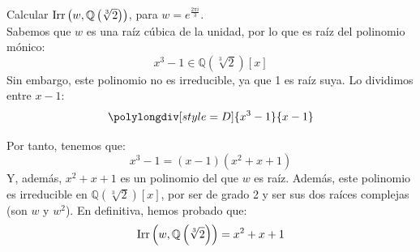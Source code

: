\begin{ejercicio}\label{ej:Irr(w,Q(sqrt[3]{2}))}
    Calcular $\operatorname{Irr}\left(w,\mathbb{Q}\left(\sqrt[3]{2}\right)\right)$, para $w=e^{\frac{2\pi i}{3}}$.\\

    \noindent
    Sabemos que $w$ es una raíz cúbica de la unidad, por lo que es raíz del polinomio mónico:
    \begin{equation*}
        x^3-1\in \mathbb{Q}\left(\sqrt[3]{2}\right)[x]
    \end{equation*}
    Sin embargo, este polinomio no es irreducible, ya que 1 es raíz suya. Lo dividimos entre $x-1$:
    \begin{equation*}
        \polylongdiv[style=D]{x^3-1}{x-1}
    \end{equation*}

    Por tanto, tenemos que:
    \begin{equation*}
        x^3-1 = (x-1)(x^2+x+1)
    \end{equation*}
    Y, además, $x^2+x+1$ es un polinomio del que $w$ es raíz. Además, este polinomio es irreducible en $\mathbb{Q}\left(\sqrt[3]{2}\right)[x]$, por ser de grado 2 y ser sus dos raíces complejas (son $w$ y $w^2$). En definitiva, hemos probado que:
    \begin{equation*}
        \operatorname{Irr}\left(w,\mathbb{Q}\left(\sqrt[3]{2}\right)\right) = x^2+x+1
    \end{equation*}
\end{ejercicio}

